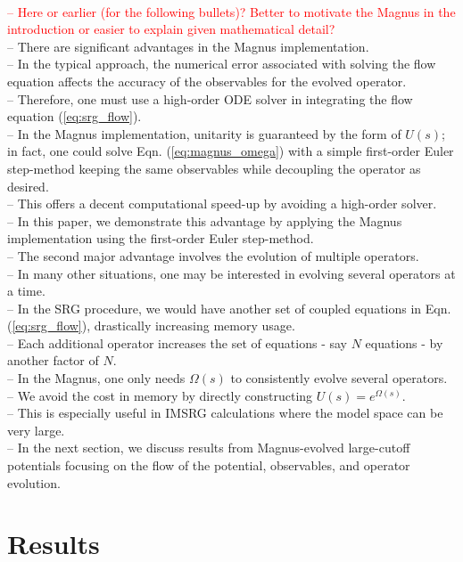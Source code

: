 \documentclass[preprintnumbers,floatfix,aps,prc,preprint,nofootinbib]{revtex4-1}
\begin{document}
\\
\textcolor{red}{%
-- Here or earlier (for the following bullets)? Better to motivate the Magnus in the introduction or easier to explain given mathematical detail?
}
\\
-- There are significant advantages in the Magnus implementation.
\\
-- In the typical approach, the numerical error associated with solving the flow equation affects the accuracy of the observables for the evolved operator.
\\
-- Therefore, one must use a high-order ODE solver in integrating the flow equation (\ref{eq:srg_flow}).
\\
-- In the Magnus implementation, unitarity is guaranteed by the form of $U(s)$; in fact, one could solve Eqn. (\ref{eq:magnus_omega}) with a simple first-order Euler step-method keeping the same observables while decoupling the operator as desired.
\\
-- This offers a decent computational speed-up by avoiding a high-order solver.
\\
-- In this paper, we demonstrate this advantage by applying the Magnus implementation using the first-order Euler step-method.
\\
-- The second major advantage involves the evolution of multiple operators.
\\
-- In many other situations, one may be interested in evolving several operators at a time.
\\
-- In the SRG procedure, we would have another set of coupled equations in Eqn. (\ref{eq:srg_flow}), drastically increasing memory usage.
\\
-- Each additional operator increases the set of equations - say $N$ equations - by another factor of $N$.
\\
-- In the Magnus, one only needs $\Omega(s)$ to consistently evolve several operators.
\\
-- We avoid the cost in memory by directly constructing $U(s)=e^{\Omega(s)}$.
\\
-- This is especially useful in IMSRG calculations where the model space can be very large.
\\
-- In the next section, we discuss results from Magnus-evolved large-cutoff potentials focusing on the flow of the potential, observables, and operator evolution.


\section{Results}
\label{sec:results}
\end{document}
